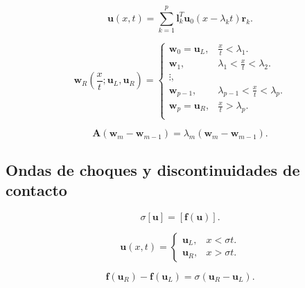 \begin{equation*}
	\symbf{u}\left(x,t\right)=
	\sum_{k=1}^{p}
	\symbf{l}^{T}_{k}
	\symbf{u}_{0}\left(x-\lambda_{k}t\right)
	\symbf{r}_{k}.
\end{equation*}

\begin{equation*}
	\symbf{w}_{R}\left(\frac{x}{t};\symbf{u}_{L},\symbf{u}_{R}\right)=
	\begin{cases}
		\symbf{w}_{0}=\symbf{u}_{L}, & \frac{x}{t}<\lambda_{1}.               \\
		\symbf{w}_{1},               & \lambda_{1}<\frac{x}{t}<\lambda_{2}.   \\
		\vdots,                      &                                        \\
		\symbf{w}_{p-1},             & \lambda_{p-1}<\frac{x}{t}<\lambda_{p}. \\
		\symbf{w}_{p}=\symbf{u}_{R}, & \frac{x}{t}>\lambda_{p}.               \\
	\end{cases}
\end{equation*}

\begin{equation*}
	\symbf{A}\left(\symbf{w}_{m}-\symbf{w}_{m-1}\right)=
	\lambda_{m}\left(\symbf{w}_{m}-\symbf{w}_{m-1}\right).
\end{equation*}

\subsection{Ondas de choques y discontinuidades de contacto}

\begin{equation*}
	\sigma\left[\symbf{u}\right]=
	\left[\symbf{f}\left(\symbf{u}\right)\right].
\end{equation*}

\begin{equation*}
	\symbf{u}\left(x,t\right)=
	\begin{cases}
		\symbf{u}_{L}, & x<\sigma t. \\
		\symbf{u}_{R}, & x>\sigma t.
	\end{cases}
\end{equation*}

\begin{equation*}
	\symbf{f}\left(\symbf{u}_{R}\right)-
	\symbf{f}\left(\symbf{u}_{L}\right)=
	\sigma
	\left(\symbf{u}_{R}-\symbf{u}_{L}\right).
\end{equation*}

